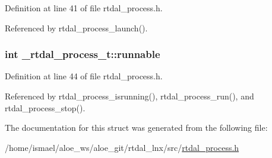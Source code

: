 Definition at line 41 of file rtdal\-\_\-process.\-h.



Referenced by rtdal\-\_\-process\-\_\-launch().

\hypertarget{struct__rtdal__process__t_a1fca7ce8ac2083e4a97e0e855f25de62}{
\subsubsection[{runnable}]{\setlength{\rightskip}{0pt plus 5cm}int \-\_\-rtdal\-\_\-process\-\_\-t\-::runnable}}\label{struct__rtdal__process__t_a1fca7ce8ac2083e4a97e0e855f25de62}


Definition at line 44 of file rtdal\-\_\-process.\-h.



Referenced by rtdal\-\_\-process\-\_\-isrunning(), rtdal\-\_\-process\-\_\-run(), and rtdal\-\_\-process\-\_\-stop().



The documentation for this struct was generated from the following file\-:\begin{DoxyCompactItemize}
\item 
/home/ismael/aloe\-\_\-ws/aloe\-\_\-git/rtdal\-\_\-lnx/src/\hyperlink{rtdal__process_8h}{rtdal\-\_\-process.\-h}\end{DoxyCompactItemize}
